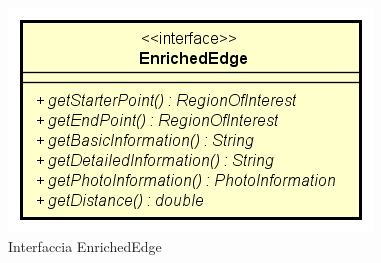 \documentclass[../DefinizioneDiProdotto.tex]{subfiles}
\begin{document}
    \begin{figure}[H]
        \centering
        \includegraphics{img/EnrichedEdge.png}
        \caption{Interfaccia EnrichedEdge}\label{fig:model::navigator::graph::edge::EnrichedEdge} 
    \end{figure}
\end{document}
